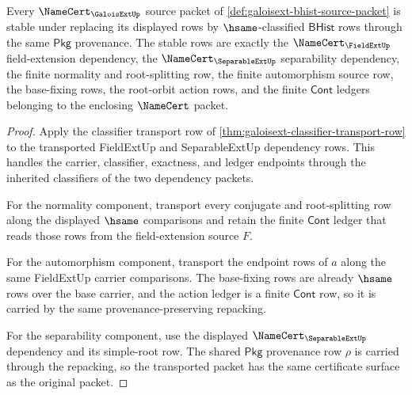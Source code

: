 \begin{theorem}
\label{thm:galoisext-normal-separable-stability}
Every $\NameCert_{\GaloisExtUp}$ source packet of
\autoref{def:galoisext-bhist-source-packet} is stable under replacing its
displayed rows by $\hsame$-classified $\mathsf{BHist}$ rows through the same
$\mathsf{Pkg}$ provenance. The stable rows are exactly the
$\NameCert_{\FieldExtUp}$ field-extension dependency, the
$\NameCert_{\SeparableExtUp}$ separability dependency, the finite normality
and root-splitting row, the finite automorphism source row, the base-fixing
rows, the root-orbit action rows, and the finite $\mathsf{Cont}$ ledgers
belonging to the enclosing $\NameCert$ packet.
\end{theorem}
\begin{proof}
Apply the classifier transport row of
\autoref{thm:galoisext-classifier-transport-row} to the transported FieldExtUp
and SeparableExtUp dependency rows. This handles the carrier, classifier,
exactness, and ledger endpoints through the inherited classifiers of the two
dependency packets.

For the normality component, transport every conjugate and root-splitting row
along the displayed $\hsame$ comparisons and retain the finite $\mathsf{Cont}$
ledger that reads those rows from the field-extension source $F$.

For the automorphism component, transport the endpoint rows of $a$ along the
same FieldExtUp carrier comparisons. The base-fixing rows are already
$\hsame$ rows over the base carrier, and the action ledger is a finite
$\mathsf{Cont}$ row, so it is carried by the same provenance-preserving
repacking.

For the separability component, use the displayed
$\NameCert_{\SeparableExtUp}$ dependency and its simple-root row. The shared
$\mathsf{Pkg}$ provenance row $\rho$ is carried through the repacking, so the
transported packet has the same certificate surface as the original packet.
\end{proof}

